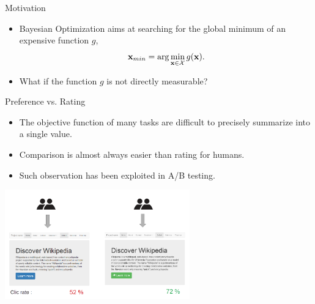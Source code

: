 \documentclass[13pt,aspectratio=1610]{beamer}
\begin{document}

\begin{frame}{Motivation}

\begin{itemize}
\item Bayesian Optimization aims at searching for the global minimum of an expensive function $g$,
\begin{equation*}\label{eq:min_problem}
\mathbf{x}_{min} = \arg \min_{\mathbf{x} \in {\mathcal X}} g(\mathbf{x}).
\end{equation*}

\item What if the function $g$ is not directly measurable?
\end{itemize}
\end{frame}

\begin{frame}{Preference vs. Rating}

\begin{itemize}
\item The objective function of many tasks are difficult to precisely summarize into a single value.
\item Comparison is almost always easier than rating for humans.
\item Such observation has been exploited in A/B testing.
\end{itemize}
\centering
\vspace{-5mm}
\includegraphics[width=0.6\textwidth]{A-B_testing_simple_example.png}
\end{frame}
\end{document}
